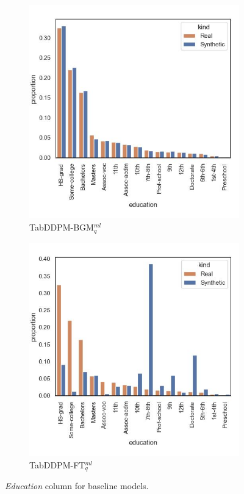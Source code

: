 \begin{figure}[t]
	\begin{subfigure}{0.32\textwidth}
		\centering
		\includegraphics[width=\textwidth]{images/dist_education/tab-ddpm-bgm.jpg}
		\caption{TabDDPM-BGM$^{ml}_q$}
	\end{subfigure}
	\begin{subfigure}{0.32\textwidth}
		\centering
		\includegraphics[width=\textwidth]{images/dist_education/tab-ddpm-ft.jpg}
		\caption{TabDDPM-FT$^{ml}_q$}
	\end{subfigure}
	\caption[Distribution Plots Categorical]{\textit{Education} column for baseline models.}
	\label{fig:education}
\end{figure}

